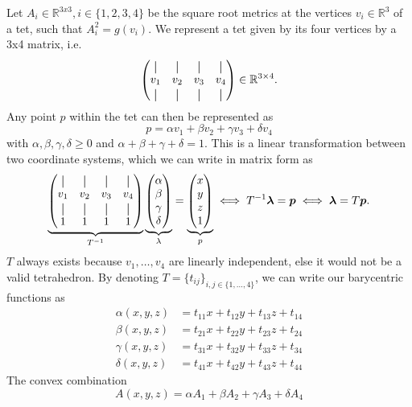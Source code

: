 \documentclass[../thesis.tex]{subfiles}
\begin{document}
Let $A_i \in \mathbb{R}^{3x3}, i \in \{1,2,3,4\}$ be the square root metrics at the vertices $v_i \in \mathbb{R}^3$ of a tet, such that
$A^2_i = g(v_i)$. We represent a tet given by its four vertices by a 3x4 matrix, i.e.
$$\begin{pmatrix}
  \vertbar & \vertbar & \vertbar & \vertbar \\
  v_1 & v_2 & v_3 & v_4 \\
  \vertbar & \vertbar & \vertbar & \vertbar
\end{pmatrix} \in \mathbb{R}^{3\times 4}.$$
Any point $p$ within the tet can then be represented as
$$p = \alpha v_1 + \beta v_2 + \gamma v_3 + \delta v_4$$
with $\alpha, \beta, \gamma, \delta \ge 0$ and $\alpha + \beta + \gamma + \delta = 1$.
This is a linear transformation between two coordinate systems, which we can write in matrix form as
$$\underbrace{\begin{pmatrix}
  \vertbar & \vertbar & \vertbar & \vertbar \\
  v_1 & v_2 & v_3 & v_4 \\
  \vertbar & \vertbar & \vertbar & \vertbar \\
  1 & 1 & 1 & 1
\end{pmatrix}}_{T^{-1}}
\underbrace{
\begin{pmatrix}
  \alpha \\ \beta \\ \gamma \\ \delta
\end{pmatrix}}_{\lambda} = \underbrace{\begin{pmatrix}
  x \\ y \\ z \\ 1 
\end{pmatrix}}_{p}
\iff
T^{-1}\bm{\lambda} = \bm{p} \iff  \bm{\lambda} = T\bm{p}.
$$
$T$ always exists because $v_1, \dots , v_4$ are linearly independent,
else it would not be a valid tetrahedron.
By denoting $T= \{ t_{ij} \}_{i,j \in \{ 1,\dots, 4\} }$, we can write our barycentric functions as
\begin{align*}
\alpha(x,y,z) &= t_{11}x + t_{12}y + t_{13}z + t_{14} \\
\beta(x,y,z) &= t_{21}x + t_{22}y + t_{23}z + t_{24} \\
\gamma(x,y,z) &= t_{31}x + t_{32}y + t_{33}z + t_{34} \\
\delta(x,y,z) &= t_{41}x + t_{42}y + t_{43}z + t_{44}
\end{align*}
The convex combination
$$A(x,y,z) = \alpha A_1 + \beta A_2 + \gamma A_3 + \delta A_4$$
\end{document}
